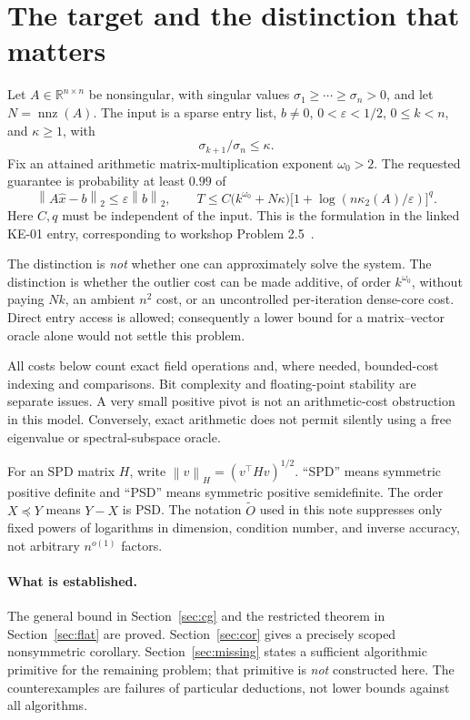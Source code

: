 \documentclass[11pt,a4paper]{article}
\newcommand{\R}{\mathbb R}
\newcommand{\nnz}{\operatorname{nnz}}
\newcommand{\softO}{\widetilde O}
\newcommand{\cond}{\kappa_2}
\newcommand{\eps}{\varepsilon}
\newcommand{\norm}[1]{\left\lVert #1\right\rVert}
\theoremstyle{definition}
\theoremstyle{remark}
\begin{document}
\tableofcontents
\newpage

\section{The target and the distinction that matters}
\label{sec:target}
Let $A\in\R^{n\times n}$ be nonsingular, with singular values
$\sigma_1\ge\cdots\ge\sigma_n>0$, and let $N=\nnz(A)$. The input is a sparse entry list, $b\ne0$, $0<\eps<1/2$, $0\le k<n$, and $\kappa\ge1$, with
\begin{equation}
 \sigma_{k+1}/\sigma_n\le\kappa. \label{eq:tail-promise}
\end{equation}
Fix an attained arithmetic matrix-multiplication exponent $\omega_0>2$. The requested guarantee is probability at least $0.99$ of
\begin{equation}
 \norm{A\widehat x-b}_2\le\eps\norm b_2,\qquad
 T\le C\bigl(k^{\omega_0}+N\kappa\bigr)
       \bigl[1+\log(n\cond(A)/\eps)\bigr]^q. \label{eq:target}
\end{equation}
Here $C,q$ must be independent of the input. This is the formulation in the linked KE-01 entry, corresponding to workshop Problem 2.5~\cite{ke01,workshop}.

The distinction is \emph{not} whether one can approximately solve the system. The distinction is whether the outlier cost can be made additive, of order $k^{\omega_0}$, without paying $Nk$, an ambient $n^2$ cost, or an uncontrolled per-iteration dense-core cost. Direct entry access is allowed; consequently a lower bound for a matrix--vector oracle alone would not settle this problem.

All costs below count exact field operations and, where needed, bounded-cost indexing and comparisons. Bit complexity and floating-point stability are separate issues. A very small positive pivot is not an arithmetic-cost obstruction in this model. Conversely, exact arithmetic does not permit silently using a free eigenvalue or spectral-subspace oracle.

For an SPD matrix $H$, write $\norm v_H=(v^\top Hv)^{1/2}$. ``SPD'' means symmetric positive definite and ``PSD'' means symmetric positive semidefinite. The order $X\preceq Y$ means $Y-X$ is PSD. The notation $\softO$ used in this note suppresses only fixed powers of logarithms in dimension, condition number, and inverse accuracy, not arbitrary $n^{o(1)}$ factors.

\paragraph{What is established.}
The general bound in Section~\ref{sec:cg} and the restricted theorem in Section~\ref{sec:flat} are proved. Section~\ref{sec:cor} gives a precisely scoped nonsymmetric corollary. Section~\ref{sec:missing} states a sufficient algorithmic primitive for the remaining problem; that primitive is \emph{not} constructed here. The counterexamples are failures of particular deductions, not lower bounds against all algorithms.
\end{document}
